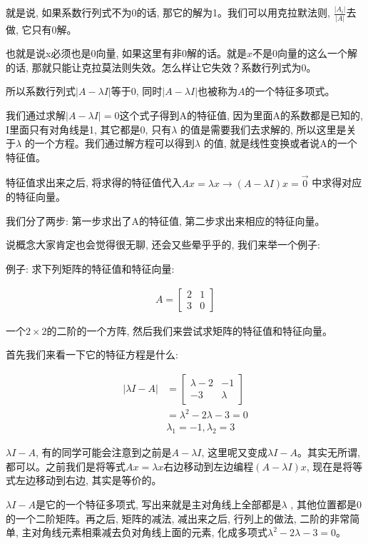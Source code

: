 就是说, 如果系数行列式不为0的话, 那它的解为1。我们可以用克拉默法则, $\frac{|A_i|}{|A|}$去做, 它只有0解。

也就是说x必须也是0向量, 如果这里有非0解的话。就是$x$不是0向量的这么一个解的话, 那就只能让克拉莫法则失效。怎么样让它失效？系数行列式为0。

所以系数行列式$|A - \lambda I|$等于0, 同时$|A - \lambda I|$也被称为$A$的一个特征多项式。

我们通过求解$|A - \lambda I|=0$这个式子得到A的特征值, 因为里面A的系数都是已知的, I里面只有对角线是1, 其它都是0, 只有$\lambda$ 的值是需要我们去求解的, 所以这里是关于$\lambda$ 的一个方程。我们通过解方程可以得到$\lambda$ 的值, 就是线性变换或者说A的一个特征值。

特征值求出来之后, 将求得的特征值代入$Ax = \lambda x \to (A - \lambda I)x = \vec 0$ 中求得对应的特征向量。

我们分了两步: 第一步求出了A的特征值, 第二步求出来相应的特征向量。

说概念大家肯定也会觉得很无聊, 还会又些晕乎乎的, 我们来举一个例子: 

例子: 求下列矩阵的特征值和特征向量: 

\begin{align*}
  A = \begin{bmatrix}2 & 1 \\ 3 & 0 \end{bmatrix}
\end{align*}

一个$2 \times 2$的二阶的一个方阵, 然后我们来尝试求矩阵的特征值和特征向量。

首先我们来看一下它的特征方程是什么: 

\begin{align*}
  |\lambda I-A| & = \begin{bmatrix} \lambda -2 & -1 \\ -3 & \lambda  \end{bmatrix} \\
  & = \lambda ^2 - 2\lambda  -3 = 0 \\
  & \lambda _1 = -1, \lambda _2 = 3
\end{align*}

$\lambda I-A$, 有的同学可能会注意到之前是$A-\lambda I$, 这里呢又变成$\lambda I-A$。其实无所谓, 都可以。之前我们是将等式$Ax = \lambda x$右边移动到左边编程$(A - \lambda I)x$, 现在是将等式左边移动到右边, 其实是等价的。

$\lambda I-A$是它的一个特征多项式, 写出来就是主对角线上全部都是$\lambda$ , 其他位置都是0的一个二阶矩阵。再之后, 矩阵的减法, 减出来之后, 行列上的做法, 二阶的非常简单, 主对角线元素相乘减去负对角线上面的元素, 化成多项式$\lambda ^2 - 2\lambda  -3 = 0$。

